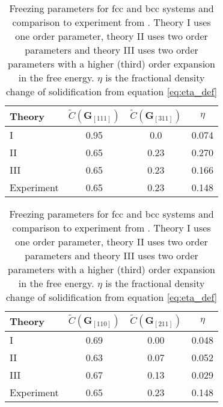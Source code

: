 \begin{table}[H]
    \begin{subtable}{0.4\linewidth}
        \centering
        \begin{tabular}{l c c c}
            \hline 
            Theory & $\tilde{C}(\mathbf{G}_{[111]})$ & $\tilde{C}(\mathbf{G}_{[311]})$ & $\eta$ \\ 
            \hline
            I & 0.95 & 0.0 & 0.074 \\
            II & 0.65 & 0.23 & 0.270 \\
            III & 0.65 & 0.23 & 0.166 \\
            Experiment & 0.65 & 0.23 & 0.148\\
            \hline
        \end{tabular}
        \caption[Freezing parameters for Argon]{Freezing parameters for fcc with
            comparison to Argon experimental results.
        }\label{table:ramakrishnan_argon}
    \end{subtable}
    \hspace{0.10\linewidth}
    \begin{subtable}{0.4\linewidth}
        \centering
        \begin{tabular}{l c c c}
            \hline 
            Theory & $\tilde{C}(\mathbf{G}_{[110]})$ & $\tilde{C}(\mathbf{G}_{[211]})$ & $\eta$ \\ 
            \hline
            I           & 0.69 & 0.00 & 0.048 \\
            II          & 0.63 & 0.07 & 0.052 \\
            III         & 0.67 & 0.13 & 0.029 \\
            Experiment  & 0.65 & 0.23 & 0.148\\
            \hline
        \end{tabular}
        \caption[Freezing parameters for Sodium]{Freezing parameters for bcc with 
            comparison to Sodium experimental results.
        }\label{table:ramakrishnan_sodium}
    \end{subtable}
    \caption[Table of Ramakrishnan results]{Freezing parameters for fcc and
        bcc systems and comparison to experiment from \cite{RAMAKRISHNAN79}.
        Theory I uses one order parameter, theory II uses two order parameters
        and theory III uses two order parameters with a higher (third) order
        expansion in the free energy. $\eta$ is the fractional density change
        of solidification from equation \ref{eq:eta_def}
    }
\end{table}

